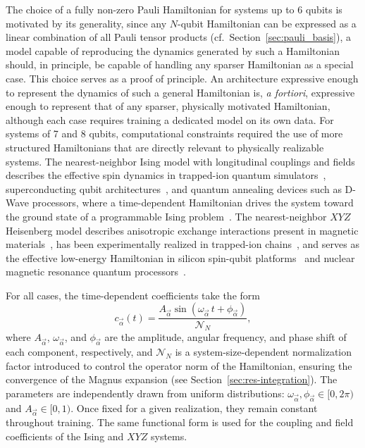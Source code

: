The choice of a fully non-zero Pauli Hamiltonian for systems up to 6 qubits is motivated by its generality, since any $N$-qubit Hamiltonian can be expressed as a linear combination of all Pauli tensor products (cf.~Section~\ref{sec:pauli_basis}), a model capable of reproducing the dynamics generated by such a Hamiltonian should, in principle, be capable of handling any sparser Hamiltonian as a special case. This choice serves as a proof of principle. An architecture expressive enough to represent the dynamics of such a general Hamiltonian is, \textit{a fortiori}, expressive enough to represent that of any sparser, physically motivated Hamiltonian, although each case requires training a dedicated model on its own data. For systems of 7 and 8 qubits, computational constraints required the use of more structured Hamiltonians that are directly relevant to physically realizable systems. The nearest-neighbor Ising model with longitudinal couplings and fields describes the effective spin dynamics in trapped-ion quantum simulators~\cite{Kim2011}, superconducting qubit architectures~\cite{Wu2016}, and quantum annealing devices such as D-Wave processors, where a time-dependent Hamiltonian drives the system toward the ground state of a programmable Ising problem~\cite{Kadowaki1998}. The nearest-neighbor $XYZ$ Heisenberg model describes anisotropic exchange interactions present in magnetic materials~\cite{Coldea2001}, has been experimentally realized in trapped-ion chains~\cite{Kim2012, Grass2014}, and serves as the effective low-energy Hamiltonian in silicon spin-qubit platforms~\cite{Zajac2018} and nuclear magnetic resonance quantum processors~\cite{Zhang2005}.

For all cases, the time-dependent coefficients take the form
\begin{equation}
\label{eq:res-coeff-form}
c_{\vec{\alpha}}(t) = \frac{A_{\vec{\alpha}} \sin(\omega_{\vec{\alpha}}\, t + \phi_{\vec{\alpha}})}{\mathcal{N}_N},
\end{equation}
where $A_{\vec{\alpha}}$, $\omega_{\vec{\alpha}}$, and $\phi_{\vec{\alpha}}$ are the amplitude, angular frequency, and phase shift of each component, respectively, and $\mathcal{N}_N$ is a system-size-dependent normalization factor introduced to control the operator norm of the Hamiltonian, ensuring the convergence of the Magnus expansion (see Section~\ref{sec:res-integration}). The parameters are independently drawn from uniform distributions: $\omega_{\vec{\alpha}}, \phi_{\vec{\alpha}} \in [0, 2\pi)$ and $A_{\vec{\alpha}} \in [0, 1)$. Once fixed for a given realization, they remain constant throughout training. The same functional form is used for the coupling and field coefficients of the Ising and $XYZ$ systems.

